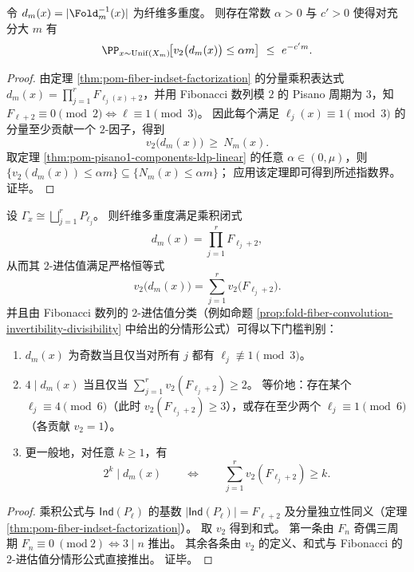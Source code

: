 \begin{corollary}\label{cor:pom-fiber-multiplicity-linear-2adic-divisibility}
令 \(d_m(x)=|\Fold_m^{-1}(x)|\) 为纤维多重度。
则存在常数 \(\alpha>0\) 与 \(c'>0\) 使得对充分大 \(m\) 有
\[
\PP_{x\sim\mathrm{Unif}(X_m)}\!\bigl[v_2\bigl(d_m(x)\bigr)\le \alpha m\bigr]\ \le\ e^{-c' m}.
\]
\end{corollary}
\begin{proof}
由定理 \ref{thm:pom-fiber-indset-factorization} 的分量乘积表达式 \(d_m(x)=\prod_{j=1}^r F_{\ell_j(x)+2}\)，并用 Fibonacci 数列模 \(2\) 的 Pisano 周期为 \(3\)，知
\(
F_{\ell+2}\equiv 0\pmod 2
\iff
\ell\equiv 1\pmod 3
\)。
因此每个满足 \(\ell_j(x)\equiv 1\pmod 3\) 的分量至少贡献一个 \(2\)-因子，得到
\[
v_2\bigl(d_m(x)\bigr)\ \ge\ N_m(x).
\]
取定理 \ref{thm:pom-pisano1-components-ldp-linear} 的任意 \(\alpha\in(0,\mu)\)，则
\(
\{v_2(d_m(x))\le \alpha m\}\subseteq \{N_m(x)\le \alpha m\}
\)；
应用该定理即可得到所述指数界。证毕。
\end{proof}

\begin{proposition}\label{prop:pom-fiber-multiplicity-v2-thresholds}
设 \(\Gamma_x\cong\bigsqcup_{j=1}^r P_{\ell_j}\)。
则纤维多重度满足乘积闭式
\[
d_m(x)=\prod_{j=1}^r F_{\ell_j+2},
\]
从而其 \(2\)-进估值满足严格恒等式
\[
v_2\bigl(d_m(x)\bigr)=\sum_{j=1}^r v_2\!\bigl(F_{\ell_j+2}\bigr).
\]
并且由 Fibonacci 数列的 \(2\)-进估值分类（例如命题 \ref{prop:fold-fiber-convolution-invertibility-divisibility} 中给出的分情形公式）可得以下门槛判别：
\begin{enumerate}
\normalfont
  \item \(d_m(x)\) 为奇数当且仅当对所有 \(j\) 都有 \(\ell_j\not\equiv 1\pmod 3\)。
  \item \(4\mid d_m(x)\) 当且仅当 \(\sum_{j=1}^r v_2(F_{\ell_j+2})\ge 2\)。
  等价地：存在某个 \(\ell_j\equiv 4\pmod 6\)（此时 \(v_2(F_{\ell_j+2})\ge 3\)），或存在至少两个 \(\ell_j\equiv 1\pmod 6\)（各贡献 \(v_2=1\)）。
  \item 更一般地，对任意 \(k\ge 1\)，有
  \[
  2^k\mid d_m(x)\qquad\Longleftrightarrow\qquad \sum_{j=1}^r v_2(F_{\ell_j+2})\ge k.
  \]
\end{enumerate}
\end{proposition}
\begin{proof}
乘积公式与 \(\mathsf{Ind}(P_\ell)\) 的基数 \(|\mathsf{Ind}(P_\ell)|=F_{\ell+2}\) 及分量独立性同义（定理 \ref{thm:pom-fiber-indset-factorization}）。
取 \(v_2\) 得到和式。
第一条由 \(F_n\) 奇偶三周期 \(F_n\equiv 0\ (\mathrm{mod}\ 2)\iff 3\mid n\) 推出。
其余各条由 \(v_2\) 的定义、和式与 Fibonacci 的 \(2\)-进估值分情形公式直接推出。
证毕。
\end{proof}

